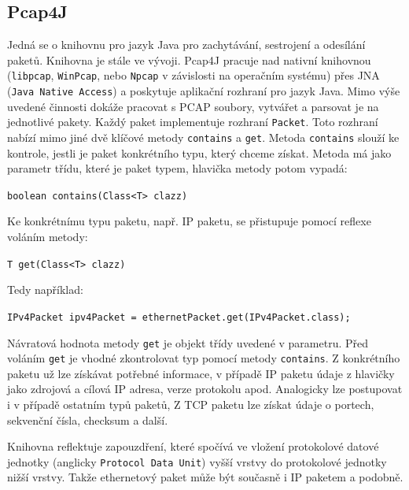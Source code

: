 \subsection{Pcap4J}
Jedná se o knihovnu pro jazyk Java pro zachytávání, sestrojení a odesílání paketů. Knihovna je stále ve vývoji. Pcap4J pracuje nad nativní knihovnou (\texttt{libpcap}, \texttt{WinPcap}, nebo \texttt{Npcap} v závislosti na operačním systému) přes JNA (\texttt{Java Native Access})
a poskytuje aplikační rozhraní pro jazyk Java. Mimo výše uvedené činnosti dokáže pracovat s PCAP soubory, vytvářet a parsovat je na jednotlivé pakety. Každý paket implementuje rozhraní \texttt{Packet}. Toto rozhraní nabízí mimo jiné dvě klíčové metody \texttt{contains} a \texttt{get}. Metoda \texttt{contains} slouží ke kontrole, jestli je paket konkrétního typu, který chceme získat. Metoda má jako parametr třídu, které je paket typem, hlavička metody potom vypadá:

\vspace{0.5cm}
\texttt{boolean contains(Class<T> clazz)}

\vspace{0.5cm}
\noindent Ke konkrétnímu typu paketu, např. IP paketu, se přistupuje pomocí reflexe voláním metody:

\vspace{0.5cm}
\texttt{T get(Class<T> clazz)}

\vspace{0.5cm}
\noindent Tedy například:

\vspace{0.5cm}
\texttt{IPv4Packet ipv4Packet = ethernetPacket.get(IPv4Packet.class);}

\vspace{0.5cm}
\noindent Návratová hodnota metody \texttt{get} je objekt třídy uvedené v parametru. Před voláním \texttt{get} je vhodné zkontrolovat typ pomocí metody \texttt{contains}. Z konkrétního paketu už lze získávat potřebné informace, v případě IP paketu údaje z hlavičky jako zdrojová a cílová IP adresa, verze protokolu apod. Analogicky lze postupovat i v případě ostatním typů paketů, Z TCP paketu lze získat údaje o portech, sekvenční čísla, checksum a další.

Knihovna reflektuje zapouzdření, které spočívá ve vložení protokolové datové jednotky (anglicky \texttt{Protocol Data Unit}) vyšší vrstvy do protokolové jednotky nižší vrstvy. Takže ethernetový paket může být současně i IP paketem a podobně.

